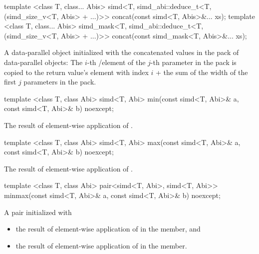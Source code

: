 \begin{itemdecl}
template <class T, class... Abis>
simd<T, simd_abi::deduce_t<T, (simd_size_v<T, Abis> + ...)>> concat(const simd<T, Abis>&... xs);
template <class T, class... Abis>
simd_mask<T, simd_abi::deduce_t<T, (simd_size_v<T, Abis> + ...)>> concat(const simd_mask<T, Abis>&... xs);
\end{itemdecl}
\begin{itemdescr}
  \pnum\returns A data-parallel object initialized with the concatenated values in the  pack of data-parallel objects:
  The $i$-th \simd/\mask element of the $j$-th parameter in the  pack is copied to the return value's element with index $i$ + the sum of the width of the first $j$ parameters in the  pack.
\end{itemdescr}

\begin{itemdecl}
template <class T, class Abi> simd<T, Abi> min(const simd<T, Abi>& a, const simd<T, Abi>& b) noexcept;
\end{itemdecl}
\begin{itemdescr}
  \pnum\returns The result of element-wise application of  \foralli.
\end{itemdescr}

\begin{itemdecl}
template <class T, class Abi> simd<T, Abi> max(const simd<T, Abi>& a, const simd<T, Abi>& b) noexcept;
\end{itemdecl}
\begin{itemdescr}
  \pnum\returns The result of element-wise application of  \foralli.
\end{itemdescr}

\begin{itemdecl}
template <class T, class Abi>
pair<simd<T, Abi>, simd<T, Abi>> minmax(const simd<T, Abi>& a, const simd<T, Abi>& b) noexcept;
\end{itemdecl}
\begin{itemdescr}
  \pnum\returns A pair initialized with
  \begin{itemize}
    \item the result of element-wise application of  \foralli in the  member, and
    \item the result of element-wise application of  \foralli in the  member.
  \end{itemize}
\end{itemdescr}

